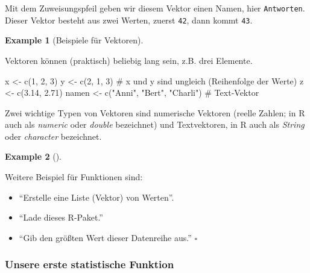 \documentclass[
  letterpaper,
  DIV=11,
  numbers=noendperiod]{scrartcl}
\newenvironment{Shaded}{\begin{snugshade}}{\end{snugshade}}
\newcommand{\CommentTok}[1]{\textcolor[rgb]{0.37,0.37,0.37}{#1}}
\newcommand{\DecValTok}[1]{\textcolor[rgb]{0.68,0.00,0.00}{#1}}
\newcommand{\FloatTok}[1]{\textcolor[rgb]{0.68,0.00,0.00}{#1}}
\newcommand{\FunctionTok}[1]{\textcolor[rgb]{0.28,0.35,0.67}{#1}}
\newcommand{\NormalTok}[1]{\textcolor[rgb]{0.00,0.23,0.31}{#1}}
\newcommand{\OtherTok}[1]{\textcolor[rgb]{0.00,0.23,0.31}{#1}}
\newcommand{\StringTok}[1]{\textcolor[rgb]{0.13,0.47,0.30}{#1}}
\providecommand{\tightlist}{%
  \setlength{\itemsep}{0pt}\setlength{\parskip}{0pt}}\usepackage{longtable,booktabs,array}
\theoremstyle{definition}
\theoremstyle{definition}
\newtheorem{example}{Example}[section]
\theoremstyle{definition}
\theoremstyle{remark}
\begin{document}
Mit dem Zuweisungspfeil geben wir diesem Vektor einen Namen, hier
\texttt{Antworten}. Dieser Vektor besteht aus zwei Werten, zuerst
\texttt{42}, dann kommt \texttt{43}.

\begin{example}[Beispiele für
Vektoren]\protect\hypertarget{exm-vektoren}{}\label{exm-vektoren}

Vektoren können (praktisch) beliebig lang sein, z.B. drei Elemente.

\begin{Shaded}
\begin{Highlighting}[]
\NormalTok{x }\OtherTok{\textless{}{-}} \FunctionTok{c}\NormalTok{(}\DecValTok{1}\NormalTok{, }\DecValTok{2}\NormalTok{, }\DecValTok{3}\NormalTok{)}
\NormalTok{y }\OtherTok{\textless{}{-}} \FunctionTok{c}\NormalTok{(}\DecValTok{2}\NormalTok{, }\DecValTok{1}\NormalTok{, }\DecValTok{3}\NormalTok{)  }\CommentTok{\# x und y sind ungleich (Reihenfolge der Werte)}
\NormalTok{z }\OtherTok{\textless{}{-}} \FunctionTok{c}\NormalTok{(}\FloatTok{3.14}\NormalTok{, }\FloatTok{2.71}\NormalTok{)  }
\NormalTok{namen }\OtherTok{\textless{}{-}} \FunctionTok{c}\NormalTok{(}\StringTok{"Anni"}\NormalTok{, }\StringTok{"Bert"}\NormalTok{, }\StringTok{"Charli"}\NormalTok{) }\CommentTok{\# Text{-}Vektor}
\end{Highlighting}
\end{Shaded}

\end{example}

Zwei wichtige Typen von Vektoren sind numerische Vektoren (reelle
Zahlen; in R auch als \emph{numeric} oder \emph{double} bezeichnet) und
Textvektoren, in R auch als \emph{String} oder \emph{character}
bezeichnet.

\begin{example}[]\protect\hypertarget{exm-funs}{}\label{exm-funs}

Weitere Beispiel für Funktionen sind:

\begin{itemize}
\tightlist
\item
  ``Erstelle eine Liste (Vektor) von Werten''.
\item
  ``Lade dieses R-Paket.''
\item
  ``Gib den größten Wert dieser Datenreihe aus.'' \(\square\)
\end{itemize}

\end{example}

\subsubsection{Unsere erste statistische Funktion}\label{sec-first-fun}
\end{document}
